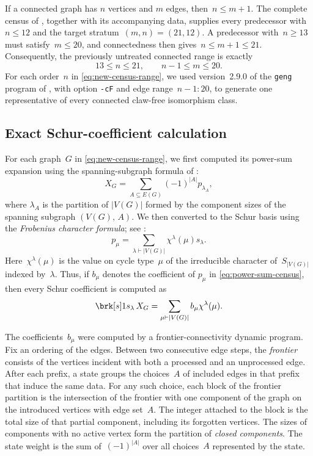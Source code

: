 \documentclass[11pt]{amsart}
\numberwithin{equation}{section}
\theoremstyle{remark}
\newcommand{\CSF}{X}
\newcommand{\coeff}[2]{\brk[s]1{s_{#1}}\,#2}
\begin{document}
If a connected graph has $n$ vertices and $m$ edges, then~$n\le m+1$.
The complete census of \citet{Prajapati2026}, together with its
accompanying data, supplies every predecessor with~$n\le12$ and the
target stratum~$(m,n)=(21,12)$. A predecessor with~$n\ge13$ must
satisfy~$m\le20$, and connectedness then gives~$n\le m+1\le21$.
Consequently, the previously untreated connected range is exactly
\begin{equation}\label{eq:new-census-range}
13\le n\le21,\qquad n-1\le m\le20.
\end{equation}
For each order~$n$ in \eqref{eq:new-census-range}, we used version~2.9.0 of
the \texttt{geng} program of \citet{McKayPiperno2014}, with option
\texttt{-cF} and edge range~$n-1{:}20$, to generate one representative of
every connected claw-free isomorphism class.

\subsection{Exact Schur-coefficient calculation}
\label{subsec:exact-calculation}

For each graph~$G$ in \cref{eq:new-census-range}, we first computed its
power-sum expansion
using the spanning-subgraph formula of \citet{Stanley1995}:
\begin{equation}\label{eq:power-sum-census}
\CSF_G=\sum_{A\subseteq E(G)}(-1)^{\lvert A\rvert}p_{\lambda_A},
\end{equation}
where $\lambda_A$ is the partition of $\lvert V(G)\rvert$ formed by the
component sizes of the spanning subgraph $(V(G),\,A)$.  We then converted
to the Schur basis using the \emph{Frobenius character formula}; see
\citet[p.~114]{Macdonald1995}:
\begin{equation}\label{eq:frobenius-census}
p_\mu=\sum_{\lambda\vdash \lvert V(G)\rvert}
\chi^\lambda(\mu)s_\lambda.
\end{equation}
Here~$\chi^\lambda(\mu)$ is the value on cycle type~$\mu$ of the
irreducible character of~$S_{\lvert V(G)\rvert}$ indexed by~$\lambda$.
Thus, if $b_\mu$ denotes the coefficient of $p_\mu$ in
\cref{eq:power-sum-census}, then every Schur coefficient is computed as
\[
\coeff{\lambda}{\CSF_G}
=\sum_{\mu\vdash \lvert V(G)\rvert}b_\mu\chi^\lambda(\mu).
\]

The coefficients~$b_\mu$ were computed by a frontier-connectivity dynamic
program.  Fix an ordering of the edges.  Between two consecutive edge steps,
the \emph{frontier} consists of the vertices incident with both a processed
and an unprocessed edge.  After each prefix, a state groups the choices~$A$
of included edges in that prefix that induce the same data.  For any such
choice, each block of the frontier partition is the intersection of the
frontier with one component of the graph on the introduced vertices with
edge set~$A$.  The integer attached to the block is the total size of that
partial component, including its forgotten vertices.  The sizes of
components with no active vertex form the partition of \emph{closed
components}.  The state weight is the sum of~$(-1)^{\lvert A\rvert}$ over
all choices~$A$ represented by the state.
\end{document}

